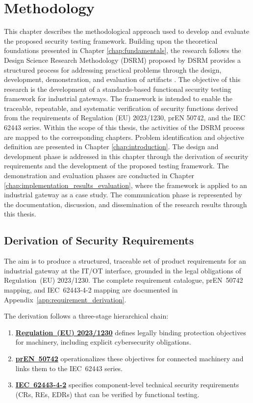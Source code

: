 \chapter{Methodology} 
\label{chap:methodology} 

This chapter describes the methodological approach used to develop and evaluate the proposed security testing framework. Building upon the theoretical foundations presented in Chapter \ref{chap:fundamentals}, the research follows the Design Science Research Methodology (DSRM) proposed by \citeauthor{Peffers} DSRM provides a structured process for addressing practical problems through the design, development, demonstration, and evaluation of artifacts \cite[p. 46]{Peffers}. The objective of this research is the development of a standards-based functional security testing framework for industrial gateways. The framework is intended to enable the traceable, repeatable, and systematic verification of security functions derived from the requirements of Regulation (EU) 2023/1230, prEN 50742, and the IEC 62443 series. Within the scope of this thesis, the activities of the DSRM process are mapped to the corresponding chapters. Problem identification and objective definition are presented in Chapter \ref{chap:introduction}. The design and development phase is addressed in this chapter through the derivation of security requirements and the development of the proposed testing framework. The demonstration and evaluation phases are conducted in Chapter \ref{chap:implementation_results_evaluation}, where the framework is applied to an industrial gateway as a case study. The communication phase is represented by the documentation, discussion, and dissemination of the research results through this thesis.

\section{Derivation of Security Requirements}
\label{sec:security_requirements}

The aim is to produce a structured, traceable set of product requirements for an industrial gateway at the IT/OT interface, grounded in the legal obligations of Regulation~(EU) 2023/1230. The complete requirement catalogue, prEN~50742 mapping, and IEC~62443-4-2 mapping are documented in Appendix~\ref{app:requirement_derivation}.


The derivation follows a three-stage hierarchical chain: 

\begin{enumerate}
	\item \hyperref[subsec:eu_machinery_regulation]{\textbf{Regulation~(EU) 2023/1230}} defines legally binding protection objectives for machinery, including explicit cybersecurity obligations.
	\item \hyperref[subsec:pren_50742]{\textbf{prEN~50742}} operationalizes these objectives for connected machinery and links them to the IEC~62443 series.
	\item \hyperref[subsec:iec_62443]{\textbf{IEC~62443-4-2}} specifies component-level technical security requirements (CRs, REs, EDRs) that can be verified by functional testing.
\end{enumerate}

